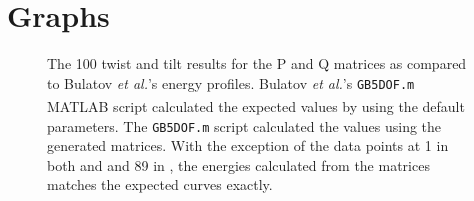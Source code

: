 \documentclass[twoside,senior]{BYUPhys}
\begin{document}
\chapter{Graphs\label{app:graphs}}
\begin{figure}[ht!]
 \centering
 
 \quad
 \caption[A comparison of the \textlangle{}100\textrangle{} copper curves with the calculated results.]{\label{appfig:compare100} The \textlangle{}100\textrangle{} twist \protect{} and tilt \protect{} results for the P and Q matrices as compared to Bulatov \emph{et al.}'s energy profiles. Bulatov \emph{et al.}'s \lstinline!GB5DOF.m! MATLAB\textsuperscript{\textregistered} script calculated the expected values by using the default parameters.  The \lstinline!GB5DOF.m! script calculated the values using the generated matrices.  With the exception of the data points at 1\textdegree{} in both \protect{} and \protect{} and 89\textdegree{} in \protect{}, the energies calculated from the matrices matches the expected curves exactly.}
\end{figure}
\end{document}
